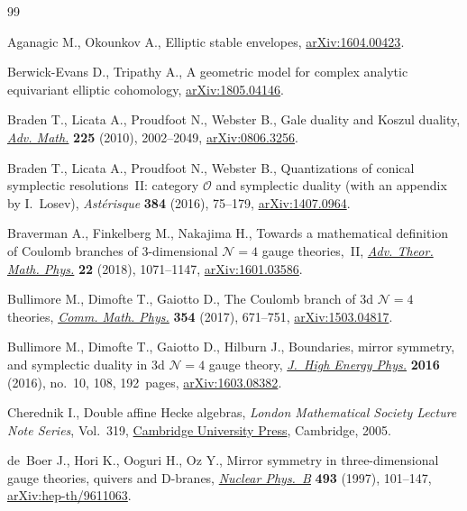 \documentclass[pdftex]{sigma}
\numberwithin{equation}{section}
\begin{document}
\begin{thebibliography}{99}
\footnotesize\itemsep=0pt

Aganagic M., Okounkov A., Elliptic stable envelopes, \href{https://arxiv.org/abs/1604.00423}{arXiv:1604.00423}.

Berwick-Evans D., Tripathy A., A geometric model for complex analytic
 equivariant elliptic cohomology, \href{https://arxiv.org/abs/1805.04146}{arXiv:1805.04146}.

Braden T., Licata A., Proudfoot N., Webster B., Gale duality and {K}oszul
 duality, \href{https://doi.org/10.1016/j.aim.2010.04.011}{\textit{Adv. Math.}} \textbf{225} (2010), 2002--2049,
 \href{https://arxiv.org/abs/0806.3256}{arXiv:0806.3256}.

Braden T., Licata A., Proudfoot N., Webster B., Quantizations of conical
 symplectic resolutions~{II}: category {$\mathcal O$} and symplectic duality
 (with an appendix by {I}.~{L}osev), \textit{Ast\'{e}risque} \textbf{384}
 (2016), 75--179, \href{https://arxiv.org/abs/1407.0964}{arXiv:1407.0964}.

Braverman A., Finkelberg M., Nakajima H., Towards a mathematical definition of
 {C}oulomb branches of 3-dimensional {${\mathcal N}=4$} gauge theories,~{II},
 \href{https://doi.org/10.4310/ATMP.2018.v22.n5.a1}{\textit{Adv. Theor. Math. Phys.}} \textbf{22} (2018), 1071--1147,
 \href{https://arxiv.org/abs/1601.03586}{arXiv:1601.03586}.

Bullimore M., Dimofte T., Gaiotto D., The {C}oulomb branch of 3d {${\mathcal
 N}=4$} theories, \href{https://doi.org/10.1007/s00220-017-2903-0}{\textit{Comm. Math. Phys.}} \textbf{354} (2017), 671--751,
 \href{https://arxiv.org/abs/1503.04817}{arXiv:1503.04817}.

Bullimore M., Dimofte T., Gaiotto D., Hilburn J., Boundaries, mirror symmetry,
 and symplectic duality in 3d {${\mathcal N}=4$} gauge theory, \href{https://doi.org/10.1007/JHEP10(2016)108}{\textit{J.~High
 Energy Phys.}} \textbf{2016} (2016), no.~10, 108, 192~pages,
 \href{https://arxiv.org/abs/1603.08382}{arXiv:1603.08382}.

Cherednik I., Double affine {H}ecke algebras, \textit{London Mathematical
 Society Lecture Note Series}, Vol.~319, \href{https://doi.org/10.1017/CBO9780511546501}{Cambridge University Press},
 Cambridge, 2005.

de~Boer J., Hori K., Ooguri H., Oz Y., Mirror symmetry in three-dimensional
 gauge theories, quivers and {D}-branes, \href{https://doi.org/10.1016/S0550-3213(97)00125-9}{\textit{Nuclear Phys.~B}} \textbf{493}
 (1997), 101--147, \href{https://arxiv.org/abs/hep-th/9611063}{arXiv:hep-th/9611063}.


\end{thebibliography}
\end{document}
